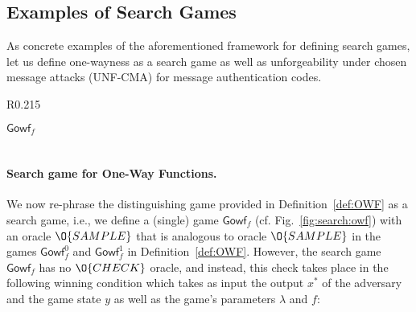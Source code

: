 \subsection{Examples of Search Games}\label{app:search:examples} As concrete examples of the aforementioned framework for defining search games, let us define one-wayness as a search game as well as unforgeability under chosen message attacks (UNF-CMA) for message authentication codes.

\begin{wrapfigure}{R}{0.215\textwidth}
\vspace{-0.7cm}
				\begin{pchstack}
\pchspace
				\begin{pcvstack}
					\underline{\underline{$\textsf{Gowf}_f$}}\\
					\\
					\pcvspace
					\pcvspace
				\end{pcvstack}
				\end{pchstack}
\vspace{-0.3cm}
\caption{\label{fig:search:owf}}
\vspace{-2cm}
\end{wrapfigure}

\paragraph{Search game for One-Way Functions.} We now re-phrase the distinguishing game provided in Definition~\ref{def:OWF} as a search game, i.e., we define a (single) game $\textsf{Gowf}_f$ (cf. Fig.~\ref{fig:search:owf}) with an oracle $\O{SAMPLE}$ that is analogous to oracle 
$\O{SAMPLE}$ in the games $\textsf{Gowf}_f^0$ and $\textsf{Gowf}_f^1$ in Definition~\ref{def:OWF}. However, the search game $\textsf{Gowf}_f$ has no $\O{CHECK}$ oracle, and instead, this check takes place in the following winning condition which takes as input the output $x^*$ of the adversary and the game state $y$ as well as the game's parameters $\lambda$ and $f$:


